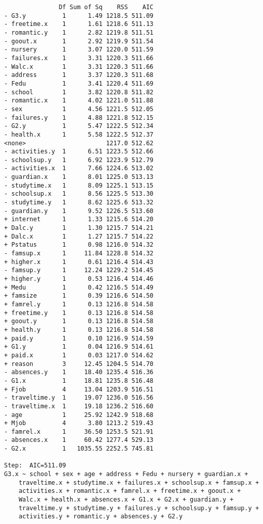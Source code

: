 \documentclass[11pt]{article}
\begin{document}
\begin{enumerate}
\begin{verbatim}
               Df Sum of Sq    RSS    AIC
- G3.y          1      1.49 1218.5 511.09
- freetime.x    1      1.61 1218.6 511.13
- romantic.y    1      2.82 1219.8 511.51
- goout.x       1      2.92 1219.9 511.54
- nursery       1      3.07 1220.0 511.59
- failures.x    1      3.31 1220.3 511.66
- Walc.x        1      3.31 1220.3 511.66
- address       1      3.37 1220.3 511.68
- Fedu          1      3.41 1220.4 511.69
- school        1      3.82 1220.8 511.82
- romantic.x    1      4.02 1221.0 511.88
- sex           1      4.56 1221.5 512.05
- failures.y    1      4.88 1221.8 512.15
- G2.y          1      5.47 1222.5 512.34
- health.x      1      5.58 1222.5 512.37
<none>                      1217.0 512.62
- activities.y  1      6.51 1223.5 512.66
- schoolsup.y   1      6.92 1223.9 512.79
- activities.x  1      7.66 1224.6 513.02
- guardian.x    1      8.01 1225.0 513.13
- studytime.x   1      8.09 1225.1 513.15
- schoolsup.x   1      8.56 1225.5 513.30
- studytime.y   1      8.62 1225.6 513.32
- guardian.y    1      9.52 1226.5 513.60
+ internet      1      1.33 1215.6 514.20
+ Dalc.y        1      1.30 1215.7 514.21
+ Dalc.x        1      1.27 1215.7 514.22
+ Pstatus       1      0.98 1216.0 514.32
- famsup.x      1     11.84 1228.8 514.32
+ higher.x      1      0.61 1216.4 514.43
- famsup.y      1     12.24 1229.2 514.45
+ higher.y      1      0.53 1216.4 514.46
+ Medu          1      0.42 1216.5 514.49
+ famsize       1      0.39 1216.6 514.50
+ famrel.y      1      0.13 1216.8 514.58
+ freetime.y    1      0.13 1216.8 514.58
+ goout.y       1      0.13 1216.8 514.58
+ health.y      1      0.13 1216.8 514.58
+ paid.y        1      0.10 1216.9 514.59
+ G1.y          1      0.04 1216.9 514.61
+ paid.x        1      0.03 1217.0 514.62
+ reason        3     12.45 1204.5 514.70
- absences.y    1     18.40 1235.4 516.36
- G1.x          1     18.81 1235.8 516.48
+ Fjob          4     13.04 1203.9 516.51
- traveltime.y  1     19.07 1236.0 516.56
- traveltime.x  1     19.18 1236.2 516.60
- age           1     25.92 1242.9 518.68
+ Mjob          4      3.80 1213.2 519.43
- famrel.x      1     36.50 1253.5 521.91
- absences.x    1     60.42 1277.4 529.13
- G2.x          1   1035.55 2252.5 745.81

Step:  AIC=511.09
G3.x ~ school + sex + age + address + Fedu + nursery + guardian.x + 
    traveltime.x + studytime.x + failures.x + schoolsup.x + famsup.x + 
    activities.x + romantic.x + famrel.x + freetime.x + goout.x + 
    Walc.x + health.x + absences.x + G1.x + G2.x + guardian.y + 
    traveltime.y + studytime.y + failures.y + schoolsup.y + famsup.y + 
    activities.y + romantic.y + absences.y + G2.y


\end{verbatim}
\end{enumerate}
\end{document}
